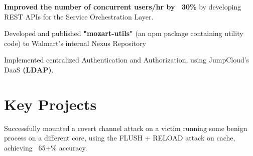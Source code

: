 \documentclass[a4paper]{deedy-resume-reversed}
\begin{document}
\begin{minipage}[t]{0.60\textwidth}
\begin{tightemize}
    \item \textbf{Improved the number of concurrent users/hr by ~30\%} by developing REST APIs for the Service Orchestration Layer.
    \item Developed and published \textbf{"mozart-utils"} (an npm package containing utility code) to Walmart's internal Nexus Repository
\end{tightemize}
\sectionsep

\begin{tightemize}
    \item Implemented centralized Authentication and Authorization, using JumpCloud’s DaaS \textbf{(LDAP)}.
\end{tightemize}
\sectionsep


\section{Key Projects}
\descript{  }
\begin{tightemize}
        \item Successfully mounted a covert channel attack on a victim running some benign process on a different core, using the FLUSH + RELOAD attack on cache, achieving ~65+\% accuracy.
\end{tightemize}
\sectionsep


\end{minipage}
\end{document}
